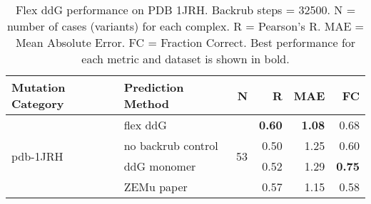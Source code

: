 \begin{table}
  \begin{tabular}{llrrrr}
\toprule
Mutation Category &   Prediction Method &   N &    R &  MAE &   FC \\
\midrule
 \multirow{ 4}{*}{pdb-1JRH} & flex ddG & \multirow{ 4}{*}{53} & \textbf{0.60} & \textbf{1.08} & 0.68  \\
 & no backrub control & & 0.50 & 1.25 & 0.60  \\
 & ddG monomer & & 0.52 & 1.29 & \textbf{0.75}  \\
 & ZEMu paper & & 0.57 & 1.15 & 0.58  \\
\bottomrule
\end{tabular}
  \caption[Flex ddG performance on PDB 1JRH]{
    Flex ddG performance on PDB 1JRH. Backrub steps = 32500. N = number of cases (variants) for each complex. R = Pearson's R. MAE = Mean Absolute Error. FC = Fraction Correct. Best performance for each metric and dataset is shown in bold.
  } \label{tab:table-pdb-1JRH}
\end{table}
